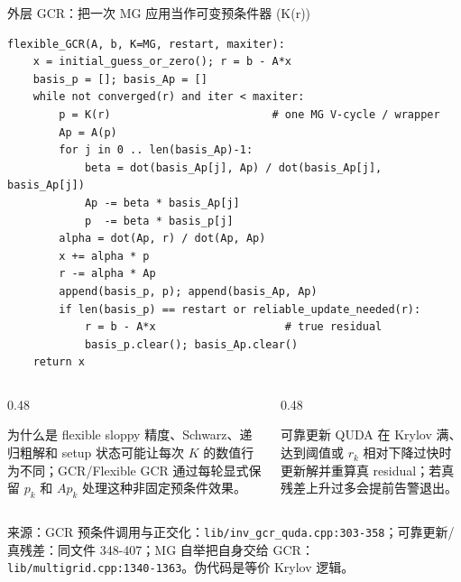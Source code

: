 \documentclass[UTF8,aspectratio=169,11pt]{ctexbeamer}
\newcommand{\source}[1]{\vspace{0.05em}\par{\raggedright\scriptsize\color{muted}来源：#1\par}}
\newcommand{\codepath}[1]{\nolinkurl{#1}}
\begin{document}
\begin{frame}[fragile,t]{外层 GCR：把一次 MG 应用当作可变预条件器 (K(r))}
  \begin{lstlisting}[firstnumber=1]
flexible_GCR(A, b, K=MG, restart, maxiter):
    x = initial_guess_or_zero(); r = b - A*x
    basis_p = []; basis_Ap = []
    while not converged(r) and iter < maxiter:
        p = K(r)                         # one MG V-cycle / wrapper
        Ap = A(p)
        for j in 0 .. len(basis_Ap)-1:
            beta = dot(basis_Ap[j], Ap) / dot(basis_Ap[j], basis_Ap[j])
            Ap -= beta * basis_Ap[j]
            p  -= beta * basis_p[j]
        alpha = dot(Ap, r) / dot(Ap, Ap)
        x += alpha * p
        r -= alpha * Ap
        append(basis_p, p); append(basis_Ap, Ap)
        if len(basis_p) == restart or reliable_update_needed(r):
            r = b - A*x                    # true residual
            basis_p.clear(); basis_Ap.clear()
    return x
  \end{lstlisting}
  \vspace{0.04cm}
  \begin{columns}[T,totalwidth=\textwidth]
    \begin{column}{0.48\textwidth}
      \begin{block}{为什么是 flexible}
        sloppy 精度、Schwarz、递归粗解和 setup 状态可能让每次 \(K\) 的数值行为不同；GCR/Flexible GCR 通过每轮显式保留 \(p_k\) 和 \(Ap_k\) 处理这种非固定预条件效果。
      \end{block}
    \end{column}
    \begin{column}{0.48\textwidth}
      \begin{alertblock}{可靠更新}
        QUDA 在 Krylov 满、达到阈值或 \(r_k\) 相对下降过快时更新解并重算真 residual；若真残差上升过多会提前告警退出。
      \end{alertblock}
    \end{column}
  \end{columns}
  \source{GCR 预条件调用与正交化：\codepath{lib/inv_gcr_quda.cpp:303-358}；可靠更新/真残差：同文件 348-407；MG 自举把自身交给 GCR：\codepath{lib/multigrid.cpp:1340-1363}。伪代码是等价 Krylov 逻辑。}
\end{frame}
\end{document}
